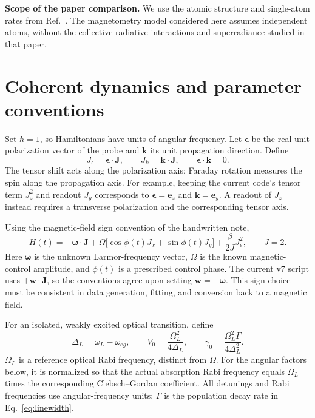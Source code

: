\documentclass[11pt,letterpaper]{article}
\newcommand{\Je}{J_{\epsilon}}
\newcommand{\Jk}{J_k}
\begin{document}
\textbf{Scope of the paper comparison.} We use the atomic structure and
single-atom rates from Ref.~\cite{masson}. The magnetometry model considered here
assumes independent atoms, without the collective radiative interactions and
superradiance studied in that paper.

\newpage
\section{Coherent dynamics and parameter conventions}

Set $\hbar=1$, so Hamiltonians have units of angular frequency. Let
$\boldsymbol\epsilon$ be the real unit polarization vector of the probe and
$\bm k$ its unit propagation direction. Define
\begin{equation}
\Je=\boldsymbol\epsilon\cdot\bm J,
\qquad \Jk=\bm k\cdot\bm J,
\qquad \boldsymbol\epsilon\cdot\bm k=0.
\end{equation}
The tensor shift acts along the polarization axis; Faraday rotation measures
the spin along the propagation axis. For example, keeping the current code's
tensor term $J_z^2$ and readout $J_y$ corresponds to
$\boldsymbol\epsilon=\bm e_z$ and $\bm k=\bm e_y$. A readout of $J_z$ instead
requires a transverse polarization and the corresponding tensor axis.

Using the magnetic-field sign convention of the handwritten note,
\begin{equation}
\boxed{
H(t)=-\bm\omega\cdot\bm J
+\Omega\bigl[\cos\phi(t)J_x+\sin\phi(t)J_y\bigr]
+\frac{\beta}{2J}\Je^2,
\qquad J=2.
}
\label{eq:hamiltonian}
\end{equation}
Here $\bm\omega$ is the unknown Larmor-frequency vector, $\Omega$ is the known
magnetic-control amplitude, and $\phi(t)$ is a prescribed control phase. The
current v7 script uses $+\bm w\cdot\bm J$, so the conventions agree upon setting
$\bm w=-\bm\omega$. This sign choice must be consistent in data generation,
fitting, and conversion back to a magnetic field.

For an isolated, weakly excited optical transition, define
\begin{equation}
\Delta_L=\omega_L-\omega_{eg},\qquad
V_0=\frac{\Omega_L^2}{4\Delta_L},\qquad
\gamma_0=\frac{\Omega_L^2\Gamma}{4\Delta_L^2}.
\label{eq:scales}
\end{equation}
$\Omega_L$ is a reference optical Rabi frequency, distinct from $\Omega$.
For the angular factors below, it is normalized so that the actual absorption
Rabi frequency equals $\Omega_L$ times the corresponding Clebsch--Gordan
coefficient. All detunings and Rabi frequencies use angular-frequency units;
$\Gamma$ is the population decay rate in Eq.~\eqref{eq:linewidth}.
\end{document}
